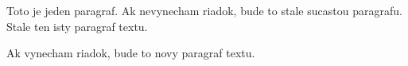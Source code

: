 \documentclass{book}
\begin{document}
Toto je jeden paragraf.
Ak nevynecham riadok, bude to stale sucastou paragrafu. 
Stale ten isty paragraf textu.

Ak vynecham riadok, bude to novy paragraf textu.
\end{document}
